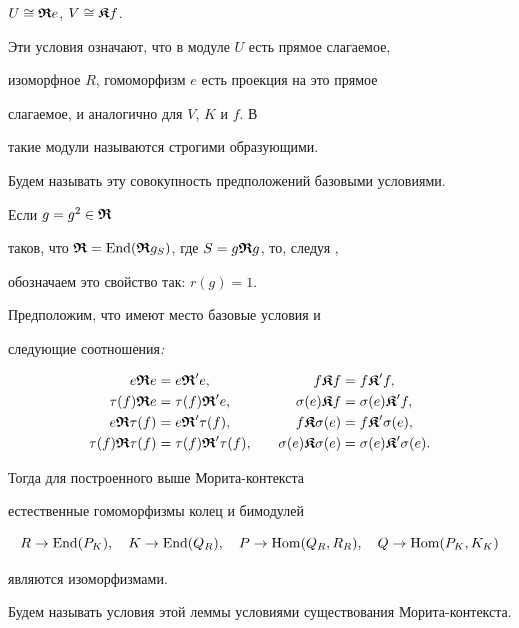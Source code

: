 $U \cong \boldsymbol{\frak R} e$, $ V \cong \boldsymbol{\frak K} f$.


Эти условия означают, что в модуле $U$ есть прямое слагаемое,


изоморфное $R$, гомоморфизм $e$ есть проекция на это прямое


слагаемое, и аналогично для $V$, $K$ и $f$. В \cite{Mih}


такие модули называются строгими образующими.


Будем называть эту совокупность предположений базовыми условиями.


Если $g=g^2\in \boldsymbol{\frak R}$


таков, что $\boldsymbol{\frak R}=\operatorname{End} (\boldsymbol{\frak R} g_S)$, где $S=g\boldsymbol{\frak R} g$, то, следуя \cite{Mih},


обозначаем это свойство так: $r(g)=1$.





\begin{lem} Предположим, что имеют место базовые условия и


следующие соотношения{\em :}


\begin{alignat*}{2}


e \R e &= e \R' e, &\quad f \K f &= f \K' f, \\


\t(f) \R e &= \t(f) \R' e, &\quad \s(e) \K f &=\s(e) \K' f, \\


e \R \t(f) &= e \R' \t(f), &\quad f \K \s(e) &=f \K' \s(e), \\


\t(f) \R \t(f)&= \t(f) \R' \t(f), &\quad \s(e) \K \s(e) &=\s(e) \K' \s(e).


\end{alignat*}


Тогда для построенного выше Морита-контекста


естественные гомоморфизмы колец и бимодулей


$$


R\to \End (P_K),\quad K\to \End (Q_R),\quad P\to \Hom ( Q_R,R_R),\quad


Q\to \Hom ( P_K, K_K)


$$


являются изоморфизмами.


\end{lem}





Будем называть условия этой леммы условиями существования Морита-контекста.


